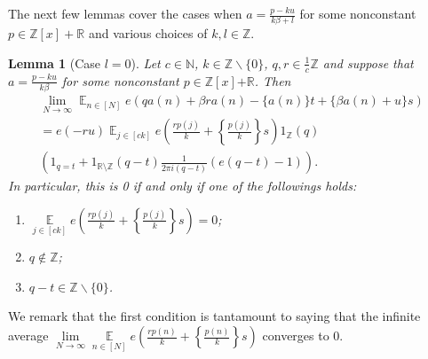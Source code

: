 \documentclass[11pt]{amsart}
\newtheorem{lemma}{Lemma}[section]
\theoremstyle{definition}
\DeclareMathOperator*{\E}{\mathbb{E}}
\newcommand{\N}{{\mathbb N}}
\newcommand{\Q}{{\mathbb Q}}
\newcommand{\R}{{\mathbb R}}
\newcommand{\Z}{{\mathbb Z}}
\newcommand{\1}{{\mathbf{1}}}
\newcommand{\brac}[1]{\mathopen{}\left( #1 \mathclose{}\right)}
\newcommand{\rem}[1]{\left \{ #1 \right \}}
\begin{document}
The next few lemmas cover the cases when $a = \frac{p - ku}{k\beta + l}$ for some nonconstant {$p\in\Z[x]+\R$} and various choices of $k,l\in\Z$.

\begin{lemma}[{Case $l=0$}]\label{L: beta a  = p + g}
Let $c\in\N$, $k\in\Z\backslash\{0\}$, $q,r\in\frac{1}{c}\Z$ and suppose that $a = \frac{p - ku}{k\beta}$ for some nonconstant $p\in\Z[x]{+\R}$. Then
\begin{multline*}%
    \lim_{N\to\infty}\E_{n\in[N]} e(qa(n)+\beta r a(n)-\{ a(n)\}t +\{\beta a(n)+u\}s)\\
    =    e\brac{-ru}\E_{j\in[ck]}e\brac{\frac{r p(j)}{k}+ \rem{\frac{p(j)}{k}}s}1_\Z(q)\\
    \brac{1_{q=t} + 1_{\R\setminus\Z}(q-t)\frac{1}{2\pi i(q-t)}(e(q-t)-1)}.
\end{multline*}
 In particular, this is 0 if and only if one of the followings holds:
    \begin{enumerate}
    \item $\E\limits_{j\in[ck]}e\brac{\frac{r p(j)}{k}+ \rem{\frac{p(j)}{k}}s}=0$;
    \item $q\notin\Z$;
    \item $q-t\in\mathbb{Z}\backslash\{0\}$.
\end{enumerate}
\end{lemma}

We remark that the first condition is tantamount to saying that the infinite average $\lim\limits_{N\to\infty}\E\limits_{n\in[N]}e\brac{\frac{rp(n)}{k}+ \rem{\frac{p(n)}{k}}s}$ converges to 0.
\end{document}
